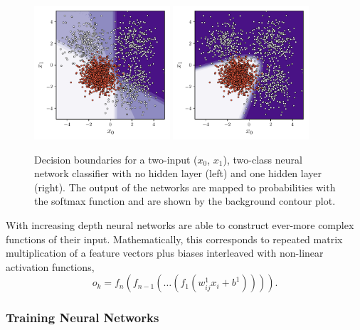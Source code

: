 \begin{figure}[h!]
    \begin{center}
        \includegraphics[width=0.45\textwidth]{figures/machine_learning/decision_bound_tanh_depth_1.pdf}
        \includegraphics[width=0.45\textwidth]{figures/machine_learning/decision_bound_tanh_depth_2.pdf}
    \end{center}
    \caption{Decision boundaries for a two-input ($x_{0}$, $x_{1}$), two-class neural network classifier with no hidden layer (left) and one hidden layer (right). The output of the networks are mapped to probabilities with the softmax function and are shown by the background contour plot. }
        \label{fig:machine_learning:mlp_example}
\end{figure}
With increasing depth neural networks are able to construct ever-more complex functions of their input. 
Mathematically, this corresponds to repeated matrix multiplication of a feature vectors plus biases interleaved with non-linear activation functions,
\begin{equation}
    o_{k} = f_{n}(f_{n-1}(\dots{}(f_{1}(w^{1}_{ij}x_{i} + b^{1})))).
\end{equation}



\subsubsection{Training Neural Networks}

